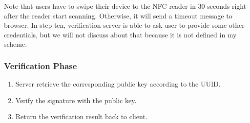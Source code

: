 \begin{CJK}{Bg5}{bsmi}
Note that users have to swipe their device to the NFC reader in 30 seconds right after the reader start scanning. Otherwise, it will send a timeout message to browser. In step ten, verification server is able to ask user to provide some other credentials, but we will not discuss about that because it is not defined in my scheme.

\subsubsection{Verification Phase}

\begin{enumerate}
\item Server retrieve the corresponding public key according to the UUID.
\item Verify the signature with the public key.
\item Return the verification result back to client.
\end{enumerate}

\end{CJK}
